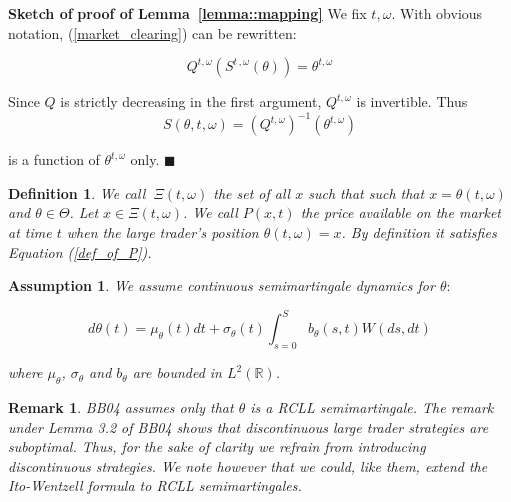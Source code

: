 \documentclass{article}
\newtheorem{definition}{Definition}
\newtheorem{remark}{Remark}
\newtheorem{assumption}{Assumption}
\begin{document}
\textbf{Sketch of} \textbf{proof of Lemma~\ref{lemma::mapping}} We fix $%
t,\omega $. With obvious notation, (\ref{market_clearing}) can be rewritten:

\begin{equation*}
Q^{t,\omega }(S^{t\,,\omega }(\theta ))=\theta ^{t,\omega }
\end{equation*}

Since $Q$ is strictly decreasing in the first argument, $Q^{t,\omega }$ is
invertible. Thus%
\begin{equation*}
S(\theta ,t,\omega )=(Q^{t,\omega })^{-1}(\theta ^{t,\omega })
\end{equation*}

is a function of $\theta ^{t,\omega }$ only. $\blacksquare $



\begin{definition}
We call $\ \Xi (t,\omega )$ the set of all $x$ such that such that $x=\theta
(t,\omega )$ and $\theta \in \Theta $. Let $x\in \Xi (t,\omega )$. We call $%
P(x,t)$ the price available on the market at time $t$ when the large
trader's position $\theta (t,\omega )=x$. By definition it satisfies
Equation (\ref{def_of_P}).
\end{definition}



\begin{assumption}
\label{ass::theta_semimartingale} We assume continuous semimartingale
dynamics for $\theta :$

\begin{equation*}
d\theta (t)=\mu _{\theta }(t)dt+\sigma _{\theta }(t)\int_{s=0}^{S}b_{\theta
}(s,t)W(ds,dt)
\end{equation*}

where $\mu _{\theta }$, $\sigma _{\theta }$ and $b_{\theta }$ are bounded in
$L^{2}(\mathbb{R})$.
\end{assumption}



\begin{remark} \label{rem::boundness_p}
BB04 assumes only that $\theta $ is a RCLL semimartingale. The remark under
Lemma 3.2 of BB04 shows that discontinuous large trader strategies are
suboptimal. Thus, for the sake of clarity we refrain from introducing
discontinuous strategies. We note however that we could, like them, extend
the Ito-Wentzell formula to RCLL semimartingales.
\end{remark}
\end{document}
